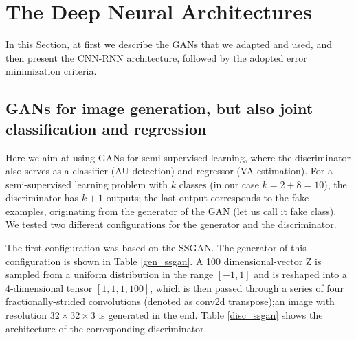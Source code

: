 \documentclass[a4paper, 10pt, conference]{ieeeconf}      %
\begin{document}
\section{The Deep Neural Architectures}
 
In this Section, at first we describe the GANs that we adapted and used, and then present the CNN-RNN architecture, followed by the adopted error minimization criteria.

\subsection{GANs for image generation, but also joint classification and regression}\label{gans}


Here we aim at using GANs for semi-supervised learning, where the discriminator also serves as a classifier (AU detection) and regressor (VA estimation). For a semi-supervised learning problem with $k$ classes (in our case $k=2+8=10$), the discriminator has $k+1$ outputs; the last output corresponds to the fake examples, originating from the generator of the GAN (let us call it fake class). We tested two different configurations for the generator and the discriminator.

The first configuration was based on the SSGAN. The generator of this configuration is shown in Table \ref{gen_ssgan}. A 100 dimensional-vector Z is sampled from a uniform distribution in the range $[-1,1]$ and is reshaped into a 4-dimensional tensor $[1, 1, 1, 100]$, which is then passed through a series of four fractionally-strided convolutions (denoted as conv2d transpose);an image with resolution $32 \times 32 \times 3$ is generated in the end. Table \ref{disc_ssgan} shows the architecture of the corresponding discriminator. 

\begin{table}[h]
\centering
\caption{Configuration 1: Generator network of our semi-supervised GAN; output is a $32 \times 32 \times 3$ image}
\label{gen_ssgan}
\end{table}
\end{document}
